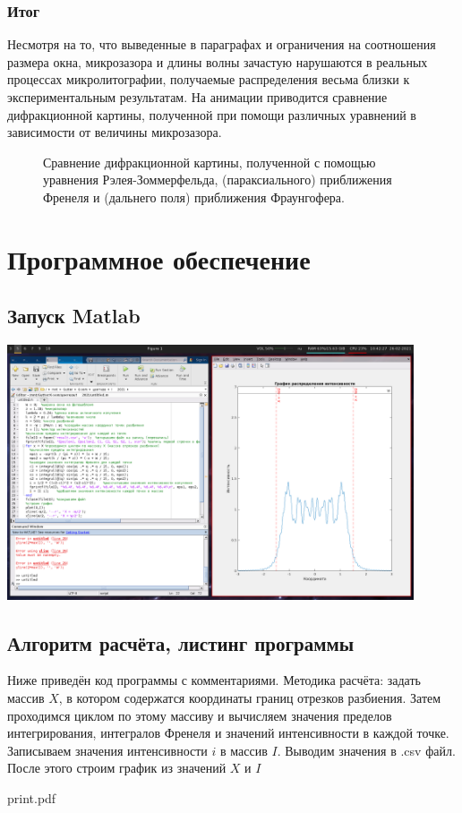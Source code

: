 \documentclass[14pt,a4paper]{extarticle}
\begin{document}
\subsubsection{Итог}
Несмотря на то, что выведенные в параграфах  и  ограничения на соотношения размера окна, микрозазора и длины волны зачастую нарушаются в реальных процессах микролитографии, получаемые распределения весьма близки к экспериментальным результатам. На анимации  приводится сравнение дифракционной картины, полученной при помощи различных уравнений в зависимости от величины микрозазора. 
\begin{center}
\end{center}

\begin{figure}[H]
	\centering
	\caption{Сравнение дифракционной картины, полученной с помощью уравнения Рэлея-Зоммерфельда, (параксиального) приближения Френеля и (дальнего поля) приближения Фраунгофера.}\label{difference}
\end{figure}

\section{Программное обеспечение}
\subsection{Запуск Matlab}
\includegraphics[width=0.9\textwidth]{zapusk.png}
\subsection{Алгоритм расчёта, листинг программы}
Ниже приведён код программы с комментариями. Методика расчёта: задать массив $X$, в котором содержатся координаты границ отрезков разбиения. Затем проходимся циклом по этому массиву и вычисляем значения пределов интегрирования, интегралов Френеля и значений интенсивности в каждой точке. Записываем значения интенсивности $i$ в массив $I$. Выводим значения в .csv файл. После этого строим график из значений $X$ и $I$
   
   {print.pdf} 
\end{document}
